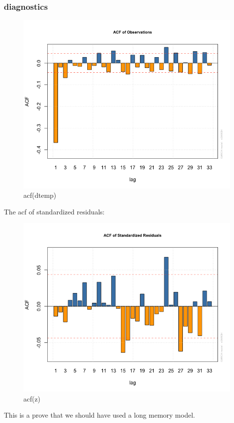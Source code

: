 \documentclass[9pt]{beamer}
\begin{document}
\begin{frame}[fragile]
\frametitle{diagnostics}
\begin{figure}[H]
\centering
\caption{acf(dtemp)}
\includegraphics[scale=.30]{original_acf.png}
\end{figure}
\end{frame}

\begin{frame}
The acf of standardized residuals:
\begin{figure}[H]
\centering
\caption{acf(z)}
\includegraphics[scale=.30]{zacf.png}
\end{figure}
This is a prove that we should have used a long memory model.
\end{frame}
\end{document}
